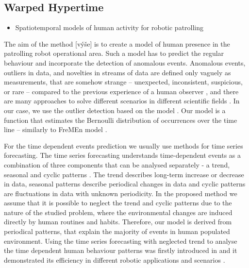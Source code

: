 \subsection{Warped Hypertime}

\begin{itemize}
    \item Spatiotemporal models of human activity for robotic patrolling
\end{itemize}

The aim of the method [výše] is to create a model of human presence in the patrolling robot operational area.
Such a model has to predict the regular behaviour and incorporate the detection of anomalous events. 
Anomalous events, outliers in data, and novelties in streams of data are defined only vaguely as measurements, that are somehow strange -- unexpected, inconsistent, suspicious, or rare -- compared to the previous experience of a human observer \cite{grubbs1969procedures}, \cite{barnett1974outliers} and there are many approaches to solve different scenarios in different scientific fields \cite{ilango2012five}. 
In our case, we use the outlier detection based on the model \cite{rousseeuw2005robust}. 
Our model is a function that estimates the Bernoulli distribution \cite{evans20004} of occurrences over the time line -- similarly to FreMEn model \cite{krajnik2014spectral,krajnik2017fremen,coppola2016learning}.

For the time dependent events prediction we usually use methods for time series forecasting.
The time series forecasting understands time-dependent events as a combination of three components that can be analysed separately - a trend, seasonal and cyclic patterns \cite{hyndman2018forecasting}.
The trend describes long-term increase or decrease in data, seasonal patterns describe periodical changes in data and cyclic patterns are fluctuations in data with unknown periodicity.
In the proposed method we assume that it is possible to neglect the trend and cyclic patterns due to the nature of the studied problem, where the environmental changes are induced directly by human routines and habits.
Therefore, our model is derived from periodical patterns, that explain the majority of events in human populated environment. 
Using the time series forecasting with neglected trend to analyse the time dependent human behaviour patterns was firstly introduced in \cite{krajnik2017fremen} and it demonstrated its efficiency in different robotic applications and scenarios \cite{fentanes2015now,krajnik2015s,santos2016lifelong}.


